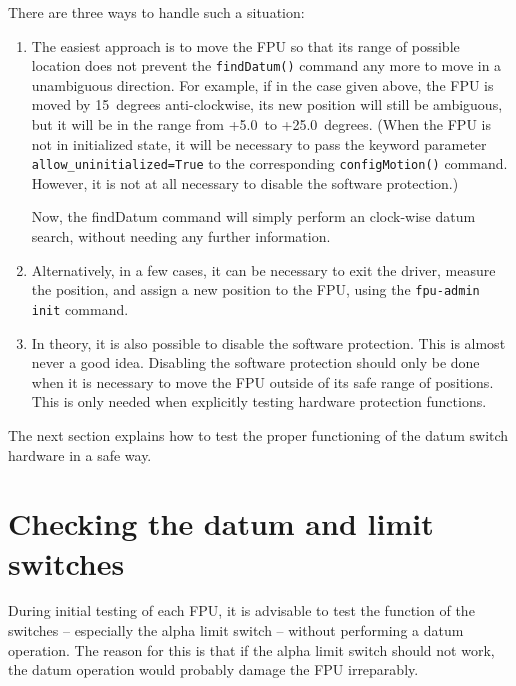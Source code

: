 \documentclass[11pt,a4paper]{scrartcl}
\begin{document}
There are three ways to handle such a situation:

\begin{enumerate}
\item The easiest approach is to move the FPU so that its range of
  possible location does not prevent the \texttt{findDatum()} command
  any more to move in a unambiguous direction. For example, if in the
  case given above, the FPU is moved by 15\degree\ degrees anti-clockwise, its
  new position will still be ambiguous, but it will be in the range
  from +5.0\degree\ to +25.0\degree\ degrees. (When the FPU is not in initialized
  state, it will be necessary to pass the keyword parameter
  \texttt{allow\_uninitialized=True} to the corresponding
  \texttt{configMotion()} command. However, it is not at all necessary
  to disable the software protection.)

  Now, the findDatum command will simply perform an clock-wise datum
  search, without needing any further information.

\item Alternatively, in a few cases, it can be necessary to exit the
  driver, measure the position, and assign a new position to the FPU,
  using the \texttt{fpu-admin init} command.

\item In theory, it is also possible to disable the software
  protection.  This is almost never a good idea. Disabling the
  software protection should only be done when it is necessary to move
  the FPU outside of its safe range of positions. This is only needed
  when explicitly testing hardware protection functions.
\end{enumerate}

The next section explains how to test the proper functioning of the
datum switch hardware in a safe way.


\section{Checking the datum and limit switches}
\label{sec:datumswitchcheck}

During initial testing of each FPU, it is advisable to test the
function of the switches -- especially the alpha limit switch --
without performing a datum operation. The reason for this is that if
the alpha limit switch should not work, the datum operation would
probably damage the FPU irreparably.
\end{document}
